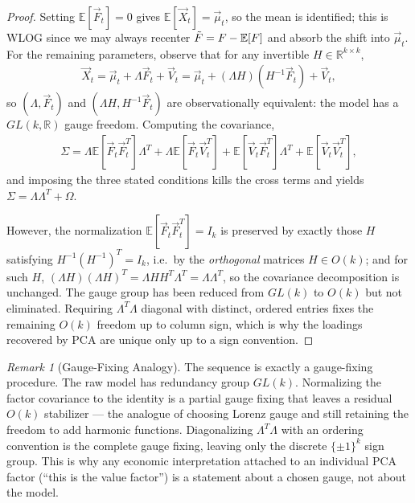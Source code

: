 \documentclass[11pt]{article}
\theoremstyle{definition}
\theoremstyle{plain}
\theoremstyle{remark}
\newtheorem{remark}{Remark}[section]
\begin{document}
\begin{proof}
    Setting $\mathbb{E}[\vec{F}_t]=0$ gives $\mathbb{E}[\vec{X}_t] = \vec{\mu}_t$, so the mean is identified; this is WLOG since we may always recenter $\Tilde{F} = F-\mathbb{E}[F]$ and absorb the shift into $\vec{\mu}_t$. For the remaining parameters, observe that for any invertible $H \in \mathbb{R}^{k\times k}$,
    \begin{align}
        \vec{X}_t = \vec{\mu}_t + \Lambda \vec{F}_t + \vec{V}_t = \vec{\mu}_t + (\Lambda H)(H^{-1} \vec{F}_t) + \vec{V}_t,
    \end{align}
    so $(\Lambda, \vec{F}_t)$ and $(\Lambda H, H^{-1}\vec{F}_t)$ are observationally equivalent: the model has a $GL(k,\mathbb{R})$ gauge freedom. Computing the covariance,
    \begin{align}
        \Sigma = \Lambda\mathbb{E}[\vec{F}_t \vec{F}_t^T]\Lambda^T + \Lambda \mathbb{E}[\vec{F}_t \vec{V}_t^T] + \mathbb{E}[\vec{V}_t\vec{F}_t ^T]\Lambda ^T + \mathbb{E}[\vec{V}_t\vec{V}_t ^T],
    \end{align}
    and imposing the three stated conditions kills the cross terms and yields $\Sigma = \Lambda\Lambda^T + \Omega$.

    However, the normalization $\mathbb{E}[\vec{F}_t\vec{F}_t^T] = I_k$ is preserved by exactly those $H$ satisfying $H^{-1}(H^{-1})^T = I_k$, i.e.\ by the \emph{orthogonal} matrices $H \in O(k)$; and for such $H$, $(\Lambda H)(\Lambda H)^T = \Lambda H H^T \Lambda^T = \Lambda\Lambda^T$, so the covariance decomposition is unchanged. The gauge group has been reduced from $GL(k)$ to $O(k)$ but not eliminated. Requiring $\Lambda^T\Lambda$ diagonal with distinct, ordered entries fixes the remaining $O(k)$ freedom up to column sign, which is why the loadings recovered by PCA are unique only up to a sign convention.
\end{proof}

\begin{remark}[Gauge-Fixing Analogy]
    The sequence is exactly a gauge-fixing procedure. The raw model has redundancy group $GL(k)$. Normalizing the factor covariance to the identity is a partial gauge fixing that leaves a residual $O(k)$ stabilizer --- the analogue of choosing Lorenz gauge and still retaining the freedom to add harmonic functions. Diagonalizing $\Lambda^T\Lambda$ with an ordering convention is the complete gauge fixing, leaving only the discrete $\{\pm 1\}^k$ sign group. This is why any economic interpretation attached to an individual PCA factor (``this is the value factor'') is a statement about a chosen gauge, not about the model.
\end{remark}
\end{document}
